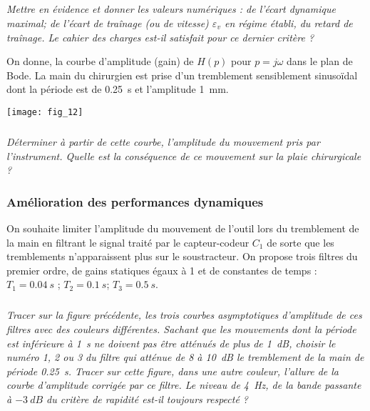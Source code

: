 \begin{multicols}{2}
\subparagraph{}\textit{Mettre en évidence et donner les valeurs numériques :
de l’écart dynamique maximal; de l’écart de traînage (ou de vitesse) $\varepsilon_v$ en régime établi, du retard de traînage. Le cahier des charges est-il satisfait pour ce dernier critère ?
}
\ifprof
\begin{corrige}
\end{corrige}
\else
\fi


On donne, la courbe d’amplitude (gain) de $H(p)$ pour $p = j\omega$ dans le plan de Bode. 
La main du chirurgien est prise d’un tremblement sensiblement sinusoïdal dont la période est de \SI{0,25}{s} et l’amplitude \SI{1}{mm}. 


\begin{center}
\texttt{[image: fig\_12]}
\end{center}

\subparagraph{}\textit{Déterminer à partir de cette courbe, l’amplitude du mouvement pris par l’instrument. Quelle est la conséquence de ce mouvement sur la plaie chirurgicale ?}
\ifprof
\begin{corrige}
\end{corrige}
\else
\fi

\subsubsection*{Amélioration des performances dynamiques}

On souhaite limiter l’amplitude du mouvement de l’outil lors du tremblement de la main en  filtrant le signal traité par le capteur-codeur $C_1$ de sorte que les tremblements n’apparaissent plus sur le soustracteur. On propose trois filtres du premier ordre, de gains statiques égaux à 1 et de constantes de temps :	 $T_1 = \SI{0,04}{s}$ ; $T_2 = \SI{0,1}{s}$; $T_3 = \SI{0,5}{s}$.



\subparagraph{}\textit{Tracer sur la figure précédente, les trois courbes asymptotiques d’amplitude de ces filtres avec des couleurs différentes. 
Sachant que les mouvements dont la période est inférieure à \SI{1}{s} ne doivent pas être atténués de plus de \SI{1}{dB}, choisir le numéro 1, 2 ou 3 du filtre qui atténue de 8 à \SI{10}{dB} le tremblement de la main de période \SI{0,25}{s}. 
Tracer sur cette figure, dans une autre couleur, l’allure de la courbe d’amplitude corrigée par ce filtre.
Le niveau de \SI{4}{Hz}, de la bande passante à $-\SI{3}{dB}$ du critère de rapidité est-il toujours respecté ? 
}
\ifprof
\begin{corrige}
\end{corrige}
\else
\fi
%
%
%

\end{multicols}
%
%
%
%
%
%
